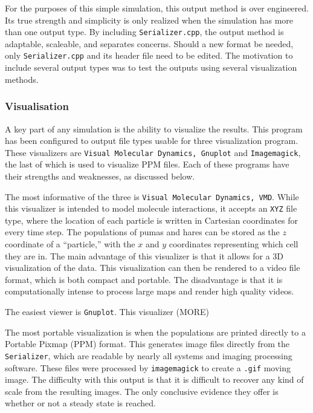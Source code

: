 \documentclass[a4paper,11pt]{article}
\begin{document}
For the purposes of this simple simulation, this output method is over engineered.  Its true strength and simplicity is only realized when the simulation has more than one output type.  By including \texttt{Serializer.cpp}, the output method is adaptable, scaleable, and separates concerns.  Should a new format be needed, only \texttt{Serializer.cpp} and its header file need to be edited.  The motivation to include several output types was to test the outputs using several visualization methods.

\subsubsection{Visualisation}

A key part of any simulation is the ability to visualize the results.  This program has been configured to output file types usable for three visualization program.  These visualizers are \texttt{Visual Molecular Dynamics, Gnuplot} and \texttt{Imagemagick}, the last of which is used to visualize PPM files.  Each of these programs have their strengths and weaknesses, as discussed below. 

The most informative of the three is \texttt{Visual Molecular Dynamics, VMD}.  While this visualizer is intended to model molecule interactions, it accepts an \texttt{XYZ} file type, where the location of each particle is written in Cartesian coordinates for every time step.  The populations of pumas and hares can be stored as the $z$ coordinate of a ``particle,'' with the $x$ and $y$ coordinates representing which cell they are in.  The main advantage of this visualizer is that it allows for a 3D visualization of the data.  This visualization can then be rendered to a video file format, which is both compact and portable.  The disadvantage is that it is computationally intense to process large maps and render high quality videos.  

The easiest viewer is \texttt{Gnuplot}.  This visualizer (MORE)

The most portable visualization is when the populations are printed directly to a Portable Pixmap (PPM) format.  This generates image files directly from the \texttt{Serializer}, which are readable by nearly all systems and imaging processing software.  These files were processed by \texttt{imagemagick} to create a \texttt{.gif} moving image.  The difficulty with this output is that it is difficult to recover any kind of scale from the resulting images.  The only conclusive evidence they offer is whether or not a steady state is reached.  
\end{document}
